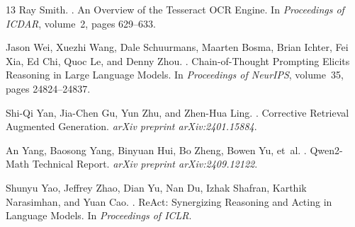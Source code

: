 \documentclass[11pt]{article}
\begin{document}
\begin{thebibliography}{13}
Ray Smith.
.
\newblock An Overview of the Tesseract OCR Engine.
\newblock In \textit{Proceedings of ICDAR}, volume~2, pages 629--633.

Jason Wei, Xuezhi Wang, Dale Schuurmans, Maarten Bosma, Brian Ichter, Fei Xia, Ed Chi, Quoc Le, and Denny Zhou.
.
\newblock Chain-of-Thought Prompting Elicits Reasoning in Large Language Models.
\newblock In \textit{Proceedings of NeurIPS}, volume~35, pages 24824--24837.

Shi-Qi Yan, Jia-Chen Gu, Yun Zhu, and Zhen-Hua Ling.
.
\newblock Corrective Retrieval Augmented Generation.
\newblock \textit{arXiv preprint arXiv:2401.15884}.

An Yang, Baosong Yang, Binyuan Hui, Bo Zheng, Bowen Yu, et~al.
.
\newblock Qwen2-Math Technical Report.
\newblock \textit{arXiv preprint arXiv:2409.12122}.

Shunyu Yao, Jeffrey Zhao, Dian Yu, Nan Du, Izhak Shafran, Karthik Narasimhan, and Yuan Cao.
.
\newblock ReAct: Synergizing Reasoning and Acting in Language Models.
\newblock In \textit{Proceedings of ICLR}.

\end{thebibliography}
\end{document}
